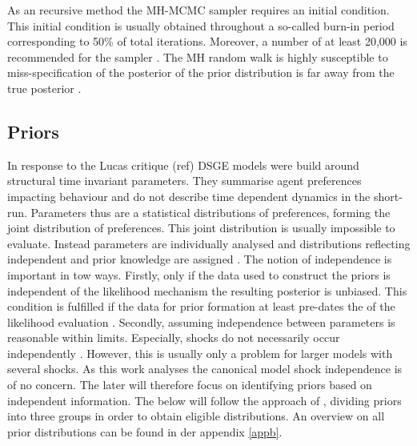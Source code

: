 \documentclass[12pt,a4paper,english]{article} %
\begin{document}
	As an recursive method the MH-MCMC sampler requires an initial condition. This initial condition is usually obtained throughout a so-called burn-in period corresponding to 50\% of total iterations. Moreover, a number of at least 20,000 is recommended for the sampler \cite{herbst_bayesian_2016}.
	The MH random walk is highly susceptible to miss-specification of the posterior of the prior distribution is far away from the true posterior \cite{herbst_bayesian_2016}.
			
	\subsection{Priors}
	In response to the Lucas critique (ref) DSGE models were build around structural time invariant parameters. They summarise agent preferences impacting behaviour and do not describe time dependent dynamics in the short-run. 
	Parameters thus are a statistical distributions of preferences, forming the joint distribution of preferences. This joint distribution is usually impossible to evaluate. Instead parameters are individually analysed and distributions reflecting independent and prior knowledge are assigned \cite{del_negro_forming_2008}.	
	The notion of independence is important in tow ways. Firstly, only if the data used to construct the priors is independent of the likelihood mechanism the resulting posterior is unbiased. This condition is fulfilled if the data for prior formation at least pre-dates the of the likelihood evaluation \cite{herbst_bayesian_2016}. Secondly, assuming independence between parameters is reasonable within limits. Especially, shocks do not necessarily occur independently \cite{herbst_bayesian_2016}. However, this is usually only a problem for larger models with several shocks. As this work analyses the canonical model shock independence is of no concern. The later will therefore focus on identifying priors based on independent information. 	
	The below will follow the approach of \cite{del_negro_forming_2008}, dividing priors into three groups in order to obtain eligible distributions. An overview on all prior distributions can be found in der appendix \ref{appb}.
	
\end{document}
